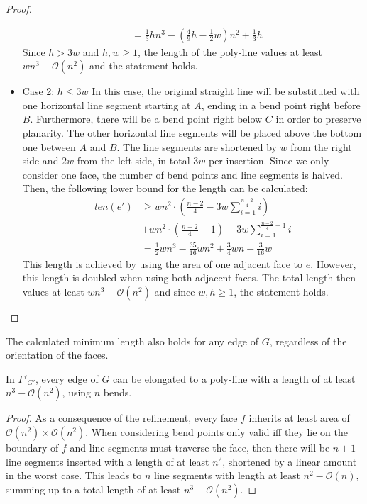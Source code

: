 \begin{proof}
\begin{itemize}
\begin{align}
			&=\frac{1}{3}hn^3-\left(\frac{4}{9}h-\frac{1}{2}w\right)n^2+\frac{1}{3}h
		\end{align}
	Since $h>3w$ and $h,w\geq1$, the length of the poly-line values at least $wn^3-\mathcal{O}(n^2)$ and the statement holds.
		\item Case 2: $h \leq 3w$
	In this case, the original straight line will be substituted with one horizontal line segment starting at $A$, ending in a bend point right before $B$. Furthermore, there will be a bend point right below $C$ in order to preserve planarity. The other horizontal line segments will be placed above the bottom one between $A$ and $B$. The line segments are shortened by $w$ from the right side and $2w$ from the left side, in total $3w$ per insertion. Since we only consider one face, the number of bend points and line segments is halved. 
	Then, the following lower bound for the length can be calculated:
	\begin{align}
		len(e') &\geq wn^2\cdot\left(\frac{n-2}{4}-3w\sum_{i = 1}^{\frac{n-2}{4}}i\right)\label{eq:horizontals}\\
		&+ wn^2\cdot \left(\frac{n-2}{4}-1\right)-3w\sum_{i=1}^{\frac{n-2}{4}-1}i\\
		&= \frac{1}{2}wn^3-\frac{35}{16}wn^2+\frac{3}{4}wn-\frac{3}{16}w
	\end{align}		
	This length is achieved by using the area of one adjacent face to $e$. However, this length is doubled when using both adjacent faces. The total length then values at least $wn^3-\mathcal{O}(n^2)$ and since  $w,h\geq1$, the statement holds.
	\end{itemize}
\end{proof}

\bigskip
The calculated minimum length also holds for any edge of $G$, regardless of the orientation of the faces.
\begin{theorem}\label{theorem:minimum-polyline-length}
\end{theorem}
In $\Gamma'_{G'}$, every edge of $G$ can be elongated to a poly-line with a length of at least $n^3 - \mathcal{O}(n^2)$, using $n$ bends.
\begin{proof}
	As a consequence of the refinement, every face $f$ inherits at least area of $\mathcal{O}(n^2)\times\mathcal{O}(n^2)$. When considering bend points only valid iff they lie on the boundary of $f$ and line segments must traverse the face, then there will be $n+1$ line segments inserted with a length of at least $n^2$, shortened by a linear amount in the worst case. This leads to $n$ line segments with length at least $n^2 - \mathcal{O}(n)$, summing up to a total length of at least $n^3-\mathcal{O}(n^2)$.
\end{proof}
